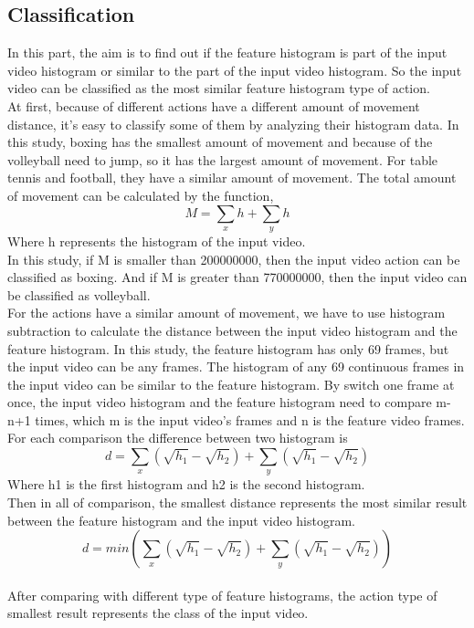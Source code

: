 \documentclass[runningheads,a4paper]{llncs}
\begin{document}
	\subsection{Classification}
		In this part, the aim is to find out if the feature histogram is part of the input video histogram or similar to the part of the input video histogram. So the input video can be classified as the most similar feature histogram type of action.\\
		At first, because of different actions have a different amount of movement distance, it’s easy to classify some of them by analyzing their histogram data. In this study, boxing has the smallest amount of movement and because of the volleyball need to jump, so it has the largest amount of movement. For table tennis and football, they have a similar amount of movement. The total amount of movement can be calculated by the function,\\
		$$M = \sum_{x} h + \sum_{y} h$$   Where h represents the histogram of the input video.\\
		In this study, if M is smaller than 200000000, then the input video action can be classified as boxing. And if M is greater than 770000000, then the input video can be classified as volleyball.\\
		For the actions have a similar amount of movement, we have to use histogram subtraction to calculate the distance between the input video histogram and the feature histogram. In this study, the feature histogram has only 69 frames, but the input video can be any frames. The histogram of any 69 continuous frames in the input video can be similar to the feature histogram.
		By switch one frame at once, the input video histogram and the feature histogram need to compare m-n+1 times, which m is the input video’s frames and n is the feature video frames.\\
		For each comparison the difference between two histogram is\\
		$$d = \sum_{x} (\sqrt{h_{1}} - \sqrt{h_{2}}) + \sum_{y} (\sqrt{h_{1}} - \sqrt{h_{2}})$$ Where h1 is the first histogram and h2 is the second histogram.\\
		Then in all of comparison, the smallest distance represents the most similar result between the feature histogram and the input video histogram.\\
		$$d = min(\sum_{x} (\sqrt{h_{1}} - \sqrt{h_{2}}) + \sum_{y} (\sqrt{h_{1}} - \sqrt{h_{2}}))$$\\
		After comparing with different type of feature histograms, the action type of smallest result represents the class of the input video.
\end{document}
